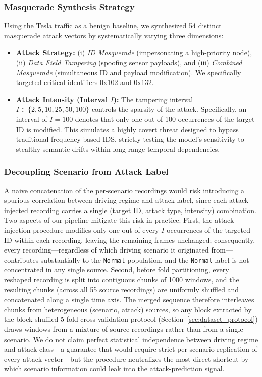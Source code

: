 \documentclass[lettersize,journal]{IEEEtran}
\begin{document}
\subsubsection{Masquerade Synthesis Strategy} 
Using the Tesla traffic as a benign baseline, we synthesized 54 distinct masquerade attack vectors by systematically varying three dimensions:
\begin{itemize}[leftmargin=*, nosep]
\item \textbf{Attack Strategy:} (i) \textit{ID Masquerade} (impersonating a high-priority node), (ii) \textit{Data Field Tampering} (spoofing sensor payloads), and (iii) \textit{Combined Masquerade} (simultaneous ID and payload modification). We specifically targeted critical identifiers 0x102 and 0x132.
\item \textbf{Attack Intensity (Interval $I$):} The tampering interval $I \in \{2, 5, 10, 25, 50, 100\}$ controls the sparsity of the attack. Specifically, an interval of $I=100$ denotes that only one out of 100 occurrences of the target ID is modified. This simulates a highly covert threat designed to bypass traditional frequency-based IDS, strictly testing the model’s sensitivity to stealthy semantic drifts within long-range temporal dependencies.
\end{itemize}

\subsubsection{Decoupling Scenario from Attack Label}
\label{sec:scenario_decoupling}
A naive concatenation of the per-scenario recordings would risk introducing a spurious correlation between driving regime and attack label, since each attack-injected recording carries a single (target ID, attack type, intensity) combination. Two aspects of our pipeline mitigate this risk in practice. First, the attack-injection procedure modifies only one out of every $I$ occurrences of the targeted ID within each recording, leaving the remaining frames unchanged; consequently, every recording---regardless of which driving scenario it originated from---contributes substantially to the \texttt{Normal} population, and the \texttt{Normal} label is not concentrated in any single source. Second, before fold partitioning, every reshaped recording is split into contiguous chunks of 1000 windows, and the resulting chunks (across all 55 source recordings) are uniformly shuffled and concatenated along a single time axis. The merged sequence therefore interleaves chunks from heterogeneous (scenario, attack) sources, so any block extracted by the block-shuffled 5-fold cross-validation protocol (Section~\ref{sec:dataset_protocol}) draws windows from a mixture of source recordings rather than from a single scenario. We do not claim perfect statistical independence between driving regime and attack class---a guarantee that would require strict per-scenario replication of every attack vector---but the procedure neutralizes the most direct shortcut by which scenario information could leak into the attack-prediction signal.
\end{document}
